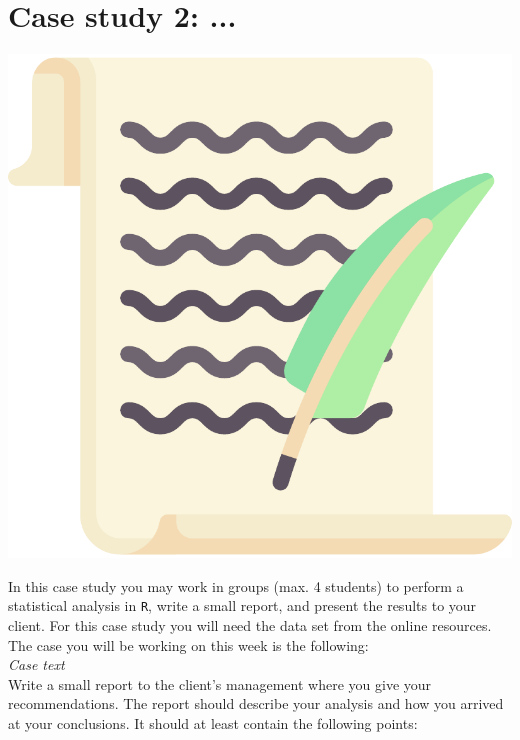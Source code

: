 
\begin{minipage}{0.8\textwidth}
\section{Case study 2: ...}
\end{minipage}%
\hfill%
\begin{minipage}{0.1\textwidth}
\includegraphics[width=\linewidth]{Files/Images/lettericon.pdf}
\end{minipage}
\vspace*{.1cm}

In this case study you may work in groups (max. 4 students) to perform a statistical analysis in \texttt{R}, write a small report, and present the results to your client. For this case study you will need the data set  from the online resources. The case you will be working on this week is the following: \\

\textit{Case text} \\

Write a small report to the client's management where you give your recommendations. The report should describe your analysis and how you arrived at your conclusions. It should at least contain the following points: \\

